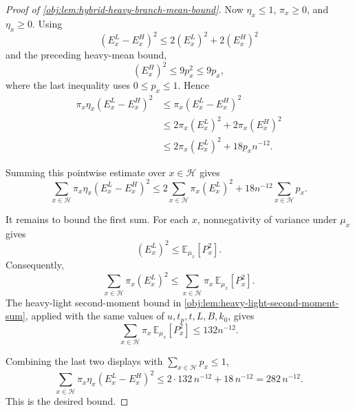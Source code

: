 \begin{proof}[Proof of \cref{obj:lem:hybrid-heavy-branch-mean-bound}]
Now \(\eta_x\le1\), \(\pi_x\ge0\), and \(\eta_x\ge0\). Using
\[
(E^L_x-E^H_x)^2\le 2(E^L_x)^2+2(E^H_x)^2
\]
and the preceding heavy-mean bound,
\[
(E^H_x)^2\le 9p_x^2\le 9p_x,
\]
where the last inequality uses \(0\le p_x\le1\). Hence
\[
\begin{aligned}
\pi_x\eta_x(E^L_x-E^H_x)^2
&\le \pi_x(E^L_x-E^H_x)^2\\
&\le 2\pi_x(E^L_x)^2+2\pi_x(E^H_x)^2\\
&\le 2\pi_x(E^L_x)^2+18p_x n^{-12}.
\end{aligned}
\]

Summing this pointwise estimate over \(x\in\mathcal H\) gives
\[
\sum_{x\in\mathcal H}\pi_x\eta_x(E^L_x-E^H_x)^2
\le
2\sum_{x\in\mathcal H}\pi_x(E^L_x)^2
+
18n^{-12}\sum_{x\in\mathcal H}p_x .
\]

It remains to bound the first sum. For each \(x\), nonnegativity of variance under \(\mu_x\) gives
\[
(E^L_x)^2
\le
\mathbb E_{\mu_x}\!\left[P_x^2\right].
\]
Consequently,
\[
\sum_{x\in\mathcal H}\pi_x(E^L_x)^2
\le
\sum_{x\in\mathcal H}\pi_x\,\mathbb E_{\mu_x}\!\left[P_x^2\right].
\]
The heavy-light second-moment bound in \cref{obj:lem:heavy-light-second-moment-sum}, applied with the same values of \(u,t_p,t,L,B,k_0\), gives
\[
\sum_{x\in\mathcal H}\pi_x\,\mathbb E_{\mu_x}\!\left[P_x^2\right]
\le 132n^{-12}.
\]

Combining the last two displays with \(\sum_{x\in\mathcal H}p_x\le1\),
\[
\sum_{x\in\mathcal H}\pi_x\eta_x(E^L_x-E^H_x)^2
\le
2\cdot132\,n^{-12}+18\,n^{-12}
=
282\,n^{-12}.
\]
This is the desired bound.
\end{proof}
